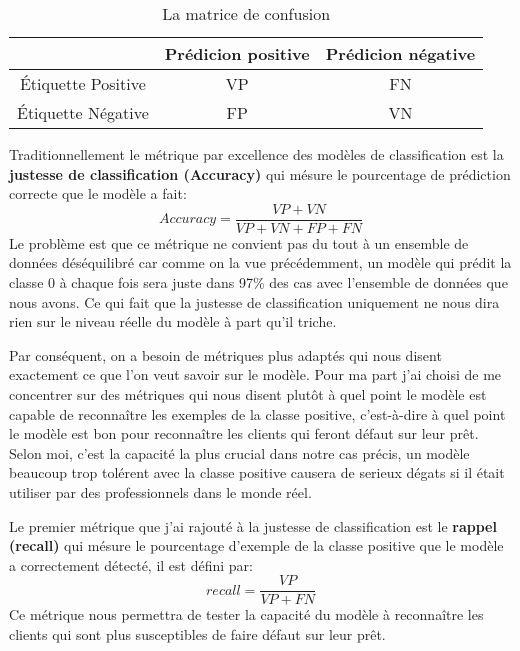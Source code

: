 \begin{table}
    \centering
    \begin{tabular}{ c|c|c| }
         & Prédicion positive & Prédicion négative \\
         \hline
        Étiquette Positive & VP & FN \\
        \hline
        Étiquette Négative & FP & VN \\
        \hline
    \end{tabular}
    \caption{La matrice de confusion}
    \label{tab:tab2}
\end{table}

Traditionnellement le métrique par excellence des modèles de classification est la \textbf{justesse de classification (Accuracy)} qui mésure le pourcentage de prédiction correcte que le modèle a fait: \[Accuracy = \frac{VP + VN}{VP + VN + FP + FN}\] Le problème est que ce métrique ne convient pas du tout à un ensemble de données déséquilibré car comme on la vue précédemment, un modèle qui prédit la classe 0 à chaque fois sera juste dans 97\% des cas avec l'ensemble de données que nous avons. Ce qui fait que la justesse de classification uniquement ne nous dira rien sur le niveau réelle du modèle à part qu'il triche.

Par conséquent, on a besoin de métriques plus adaptés qui nous disent exactement ce que l'on veut savoir sur le modèle. Pour ma part j'ai choisi de me concentrer sur des métriques qui nous disent plutôt à quel point le modèle est capable de reconnaître les exemples de la classe positive, c'est-à-dire à quel point le modèle est bon pour reconnaître les clients qui feront défaut sur leur prêt. Selon moi, c'est la capacité la plus crucial dans notre cas précis, un modèle beaucoup trop tolérent avec la classe positive causera de serieux dégats si il était utiliser par des professionnels dans le monde réel.

Le premier métrique que j'ai rajouté à la justesse de classification est le \textbf{rappel (recall)} qui mésure le pourcentage d'exemple de la classe positive que le modèle a correctement détecté, il est défini par:\[recall = \frac{VP}{VP + FN}\] Ce métrique nous permettra de tester la capacité du modèle à reconnaître les clients qui sont plus susceptibles de faire défaut sur leur prêt.

